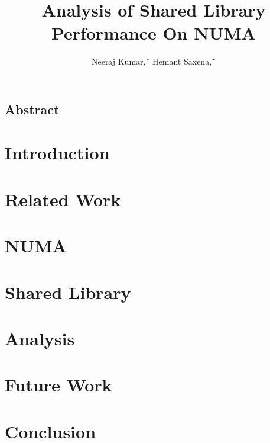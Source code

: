 \documentclass{IEEEtran}
\title{Analysis of Shared Library Performance On NUMA}
\author{Neeraj Kumar,˜\IEEEmembership{University of Waterloo }
	Hemant Saxena,˜\IEEEmembership{University of Waterloo} }
\begin{document}
\maketitle

\subsection*{Abstract}


\section{Introduction}


\section{Related Work}


\section{NUMA}


\section{Shared Library}


\section{Analysis}


\section{Future Work}


\section{Conclusion}




\end{document}
